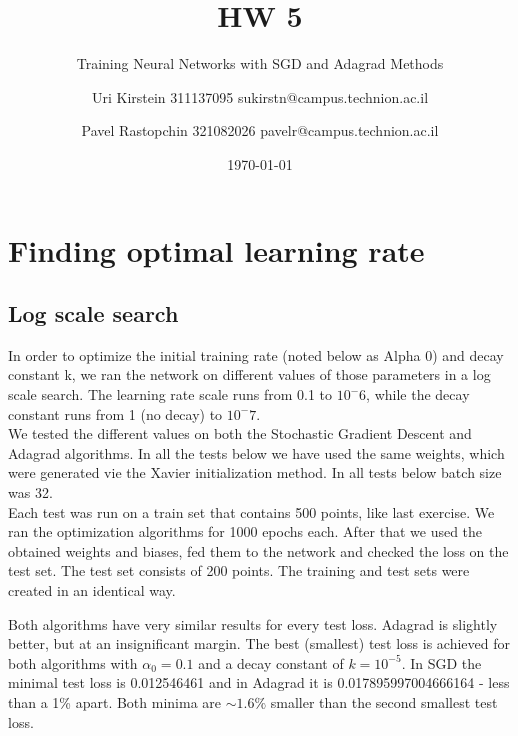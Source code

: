 \documentclass[12pt]{scrartcl}
\begin{document}

\titlehead{CS department, Technion}
\subject{Introduction to Optimization and Deep Learning 236330}
\title{HW 5}
\subtitle{Training Neural Networks with SGD and Adagrad Methods}
\author{Uri Kirstein 311137095 \hfill sukirstn@campus.technion.ac.il\and Pavel Rastopchin 321082026 pavelr@campus.technion.ac.il}
\date{\today}
\maketitle


\section{Finding optimal learning rate}
\subsection{Log scale search}
In order to optimize the initial training rate (noted below as Alpha 0) and decay constant k, we ran the network on different values of those parameters in a log scale search. The learning rate scale runs from 0.1 to $10^-6$, while the decay constant runs from 1 (no decay) to $10^-7$.\\

We tested the different values on both the Stochastic Gradient Descent and Adagrad algorithms. In all the tests below we have used the same weights, which were generated vie the Xavier initialization method. In all tests below batch size was 32.\\
Each test was run on a train set that contains 500 points, like last exercise. We ran the optimization algorithms for 1000 epochs each. After that we used the obtained weights and biases, fed them to the network and checked the loss on the test set. The test set consists of 200 points. The training and test sets were created in an identical way.



Both algorithms have very similar results for every test loss. Adagrad is slightly better, but at an insignificant margin. The best (smallest) test loss is achieved for both algorithms with $\alpha_0 = 0.1$ and a decay constant of $k=10^{-5}$. In SGD the minimal test loss is 0.012546461 and in Adagrad it is 0.017895997004666164 - less than a 1\% apart. Both minima are $\sim 1.6\%$ smaller than the second smallest test loss.\\
\end{document}
